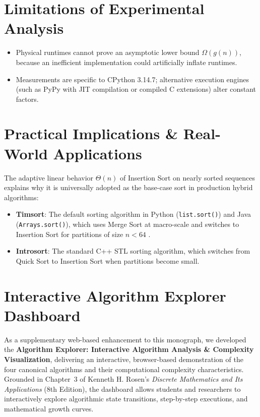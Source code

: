 \documentclass[11pt,a4paper,oneside]{report}
\newcommand{\DocDashboardTitle}{Algorithm Explorer: Interactive Algorithm Analysis \& Complexity Visualization}
\theoremstyle{definition}
\begin{document}
\section{Limitations of Experimental Analysis}
\begin{itemize}
    \item Physical runtimes cannot prove an asymptotic lower bound $\Omega(g(n))$, because an inefficient implementation could artificially inflate runtimes.
    \item Measurements are specific to CPython 3.14.7; alternative execution engines (such as PyPy with JIT compilation or compiled C extensions) alter constant factors.
\end{itemize}

\section{Practical Implications \& Real-World Applications}
The adaptive linear behavior $\Theta(n)$ of Insertion Sort on nearly sorted sequences explains why it is universally adopted as the base-case sort in production hybrid algorithms:
\begin{itemize}
    \item \textbf{Timsort}: The default sorting algorithm in Python (\texttt{list.sort()}) and Java (\texttt{Arrays.sort()}), which uses Merge Sort at macro-scale and switches to Insertion Sort for partitions of size $n < 64$ \cite{peters2002timsort}.
    \item \textbf{Introsort}: The standard C++ STL sorting algorithm, which switches from Quick Sort to Insertion Sort when partitions become small.
\end{itemize}

\section{Interactive Algorithm Explorer Dashboard}
\label{sec:dashboard_link}
As a supplementary web-based enhancement to this monograph, we developed the \textbf{\DocDashboardTitle{}}, delivering an interactive, browser-based demonstration of the four canonical algorithms and their computational complexity characteristics. Grounded in Chapter~3 of Kenneth H. Rosen's \emph{Discrete Mathematics and Its Applications} (8th Edition), the dashboard allows students and researchers to interactively explore algorithmic state transitions, step-by-step executions, and mathematical growth curves.
\end{document}

